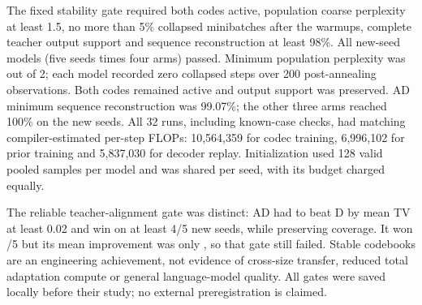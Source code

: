The fixed stability gate required both codes active, population coarse
perplexity at least 1.5, no more than 5\% collapsed minibatches after the warmups,
complete teacher output support and sequence reconstruction at least 98\%.
All \StabilityModels{} new-seed models (five seeds times four arms) passed.
Minimum population perplexity was \StabilityPP{} out of 2; each model recorded
zero collapsed steps over 200 post-annealing observations. Both codes remained
active and output support was preserved. AD minimum sequence reconstruction was
99.07\%; the other three arms reached 100\% on the new seeds.
All 32 runs, including known-case checks, had matching compiler-estimated
per-step FLOPs: 10,564,359 for codec training, 6,996,102 for prior training and
5,837,030 for decoder replay. Initialization used 128 valid pooled samples per
model and was shared per seed, with its budget charged equally.

The reliable teacher-alignment gate was distinct: AD had to beat D by mean TV
at least 0.02 and win on at least 4/5 new seeds, while preserving coverage.
It won \FinalAlignmentWins{}/5 but its mean improvement was only
\FinalAlignmentGain{}, so that gate still failed. Stable codebooks are an
engineering achievement, not evidence of cross-size transfer, reduced total
adaptation compute or general language-model quality. All gates were saved
locally before their study; no external preregistration is claimed.


